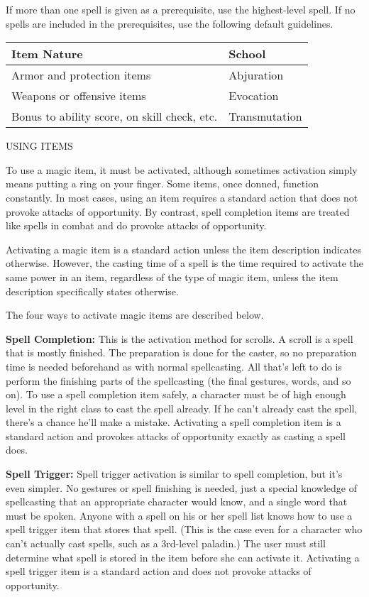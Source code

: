 \documentclass{article}
\begin{document}
If more than one spell is given as a prerequisite, use the highest-level spell. 
If no spells are included in the prerequisites, use the following default guidelines.

\begin{tabular}{|>{\raggedright}p{166pt}|>{\raggedright}p{57pt}|}
\hline
I\textbf{tem Nature} & S\textbf{chool}\tabularnewline
\hline
Armor and protection items & Abjuration\tabularnewline
\hline
Weapons or offensive items & Evocation\tabularnewline
\hline
Bonus to ability score, on skill check, etc. & Transmutation\tabularnewline
\hline
\end{tabular}

\vspace{12pt}
{\large{}USING ITEMS}

To use a magic item, it must be activated, although sometimes activation simply 
means putting a ring on your finger. Some items, once donned, function constantly. 
In most cases, using an item requires a standard action that does not provoke attacks 
of opportunity. By contrast, spell completion items are treated like spells in 
combat and do provoke attacks of opportunity.

Activating a magic item is a standard action unless the item description indicates 
otherwise. However, the casting time of a spell is the time required to activate 
the same power in an item, regardless of the type of magic item, unless the item 
description specifically states otherwise.

The four ways to activate magic items are described below.

\textbf{Spell Completion:} This is the activation method for scrolls. A scroll 
is a spell that is mostly finished. The preparation is done for the caster, so 
no preparation time is needed beforehand as with normal spellcasting. All that's 
left to do is perform the finishing parts of the spellcasting (the final gestures, 
words, and so on). To use a spell completion item safely, a character must be of 
high enough level in the right class to cast the spell already. If he can't already 
cast the spell, there's a chance he'll make a mistake. Activating a spell completion 
item is a standard action and provokes attacks of opportunity exactly as casting 
a spell does.

\textbf{Spell Trigger:} Spell trigger activation is similar to spell completion, 
but it's even simpler. No gestures or spell finishing is needed, just a special 
knowledge of spellcasting that an appropriate character would know, and a single 
word that must be spoken. Anyone with a spell on his or her spell list knows how 
to use a spell trigger item that stores that spell. (This is the case even for 
a character who can't actually cast spells, such as a 3rd-level paladin.) The user 
must still determine what spell is stored in the item before she can activate it. 
Activating a spell trigger item is a standard action and does not provoke attacks 
of opportunity.
\end{document}
